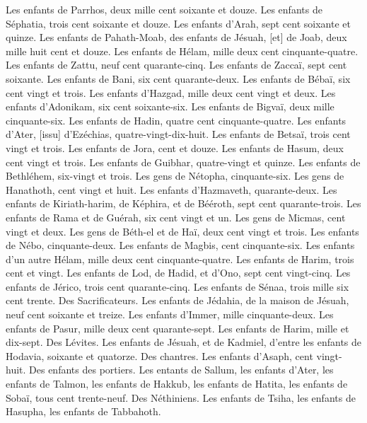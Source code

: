 \begin{multicols}{2}
Les enfants de Parrhos, deux mille cent soixante et douze.
Les enfants de Séphatia, trois cent soixante et douze.
Les enfants d'Arah, sept cent soixante et quinze.
Les enfants de Pahath-Moab, des enfants de Jésuah, [et] de Joab, deux mille huit cent et douze.
Les enfants de Hélam, mille deux cent cinquante-quatre.
Les enfants de Zattu, neuf cent quarante-cinq.
Les enfants de Zaccaï, sept cent soixante.
Les enfants de Bani, six cent quarante-deux.
Les enfants de Bébaï, six cent vingt et trois.
Les enfants d'Hazgad, mille deux cent vingt et deux.
Les enfants d'Adonikam, six cent soixante-six.
Les enfants de Bigvaï, deux mille cinquante-six.
Les enfants de Hadin, quatre cent cinquante-quatre.
Les enfants d'Ater, [issu] d'Ezéchias, quatre-vingt-dix-huit.
Les enfants de Betsaï, trois cent vingt et trois.
Les enfants de Jora, cent et douze.
Les enfants de Hasum, deux cent vingt et trois.
Les enfants de Guibhar, quatre-vingt et quinze.
Les enfants de Bethléhem, six-vingt et trois.
Les gens de Nétopha, cinquante-six.
Les gens de Hanathoth, cent vingt et huit.
Les enfants d'Hazmaveth, quarante-deux.
Les enfants de Kiriath-harim, de Képhira, et de Bééroth, sept cent quarante-trois.
Les enfants de Rama et de Guérah, six cent vingt et un.
Les gens de Micmas, cent vingt et deux.
Les gens de Béth-el et de Haï, deux cent vingt et trois.
Les enfants de Nébo, cinquante-deux.
Les enfants de Magbis, cent cinquante-six.
Les enfants d'un autre Hélam, mille deux cent cinquante-quatre.
Les enfants de Harim, trois cent et vingt.
Les enfants de Lod, de Hadid, et d'Ono, sept cent vingt-cinq.
Les enfants de Jérico, trois cent quarante-cinq.
Les enfants de Sénaa, trois mille six cent trente.
Des Sacrificateurs. Les enfants de Jédahia, de la maison de Jésuah, neuf cent soixante et treize.
Les enfants d'Immer, mille cinquante-deux.
Les enfants de Pasur, mille deux cent quarante-sept.
Les enfants de Harim, mille et dix-sept.
Des Lévites. Les enfants de Jésuah, et de Kadmiel, d'entre les enfants de Hodavia, soixante et quatorze.
Des chantres. Les enfants d'Asaph, cent vingt-huit.
Des enfants des portiers. Les entants de Sallum, les enfants d'Ater, les enfants de Talmon, les enfants de Hakkub, les enfants de Hatita, les enfants de Sobaï, tous cent trente-neuf.
Des Néthiniens. Les enfants de Tsiha, les enfants de Hasupha, les enfants de Tabbahoth.

\end{multicols}
